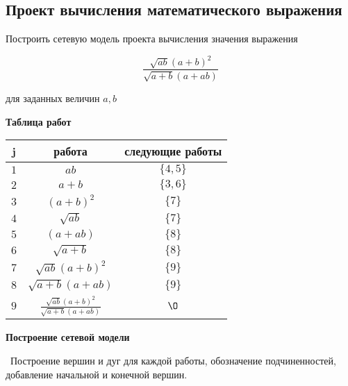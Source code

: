 \subsection{Проект вычисления математического выражения}


Построить сетевую модель проекта вычисления значения выражения

\[\boxed{\frac{\sqrt{ab}(a + b)^2}{\sqrt{a + b}(a + ab)}}\]

для заданных величин $a, b$

\bigskip

\textbf{Таблица работ}

\begin{table}[H]
	\centering
	\begin{tabular}{ | c | c | c | } 
		\hline
		j & работа & следующие работы \\\hline
		$1$ & $ab$ & $\{4,5\}$ \\\hline
		$2$ & $a+b$ & $\{3, 6\}$ \\\hline
		$3$ & $(a+b)^2$ & $\{7\}$ \\\hline
		$4$ & $\sqrt{ab}$ & $\{7\}$ \\\hline
		$5$ & $(a+ab)$ & $\{8\}$ \\\hline
		$6$ & $\sqrt{a+b}$ & $\{8\}$ \\\hline
		$7$ & $\sqrt{ab}(a+b)^2$ & $\{9\}$ \\\hline
		$8$ & $\sqrt{a+b}(a+ab)$ & $\{9\}$ \\\hline
		$9$ & $\frac{\sqrt{ab}(a + b)^2}{\sqrt{a + b}(a + ab)}$ & $\O$ \\\hline
	\end{tabular}
\end{table}

\bigskip

\textbf{Построение сетевой модели}

 $\,$ Построение вершин и дуг для каждой работы, обозначение подчиненностей, добавление начальной и конечной вершин.

